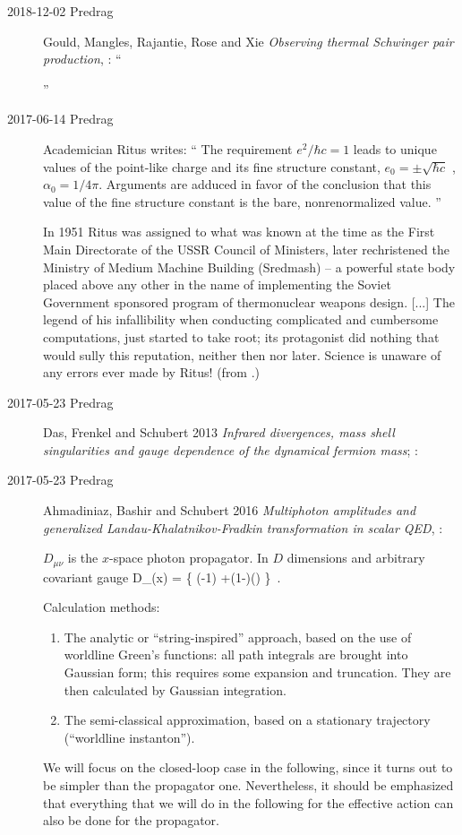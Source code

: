 \begin{description}
\item[2018-12-02 Predrag]
Gould, Mangles, Rajantie, Rose and Xie {\em Observing thermal
{Schwinger} pair production}, : ``

''

\item[2017-06-14 Predrag]
Academician Ritus writes: ``
The requirement  {$ e^{2}/\hbar c = 1$} leads to unique values of the
point-like charge and its fine structure constant, {$ e_{0} = \pm
\sqrt{\hbar c}$} , {$ \alpha_{0} = 1/4 \pi$}. Arguments are adduced in
favor of the conclusion that this value of the fine structure constant is
the bare, nonrenormalized value.
''

In 1951 Ritus was assigned to what was known at the time as the First Main
Directorate of the USSR Council of Ministers, later rechristened the
Ministry of Medium Machine Building (Sredmash) -- a powerful state body
placed above any other in the name of implementing the Soviet Government
sponsored program of thermonuclear weapons design. [...]
The legend of his infallibility when conducting complicated and
cumbersome computations, just started to take root; its protagonist did
nothing that would sully this reputation, neither then nor later. Science
is unaware of any errors ever made by Ritus! (from .)

\item[2017-05-23 Predrag]

Das, Frenkel and Schubert 2013
{\em Infrared divergences, mass shell singularities and gauge dependence
of the dynamical fermion mass};
 :

\item[2017-05-23 Predrag]
Ahmadiniaz, Bashir and Schubert 2016
{\em Multiphoton amplitudes and generalized {Landau-Khalatnikov-Fradkin}
transformation in scalar {QED}},  	:

$D_{\mu\nu} $ is the $x$-space photon
propagator. In $D$ dimensions and arbitrary covariant gauge
\beq
D_{\mu\nu}(x) =
\Big\{
\Gamma\Big(-1\Big)
    +(1-\xi)\Gamma\Big(\Big)
\Big\}
\,.

Calculation methods:
\begin{enumerate}
  \item
The analytic or ``string-inspired'' approach, based on the use of
worldline Green's functions: all path integrals are brought into Gaussian
form; this requires some expansion and truncation. They are then
calculated by Gaussian integration.
  \item
The semi-classical approximation, based on a stationary trajectory
(``worldline instanton'').
\end{enumerate}
We will focus on the closed-loop case in the following, since it turns out to
be simpler than the propagator one. Nevertheless, it should be emphasized
that everything that we will do in the following for the effective action can
also be done for the propagator.


\end{description}
